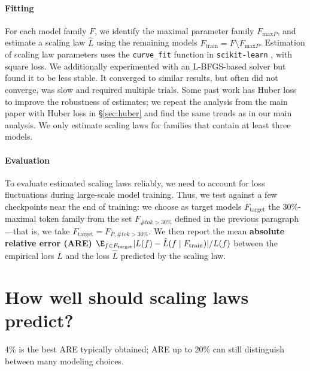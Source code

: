 \documentclass{article}
\makeatletter
\theoremstyle{plain}
\theoremstyle{definition}
\theoremstyle{remark}
\DeclarePairedDelimiter\abs{\lvert}{\rvert}%
\let\oldabs\abs
\def\abs{\@ifstar{\oldabs}{\oldabs*}}
\newcommand{\mathmsize}{\#\texttt{params}}
\newcommand{\mathperf}{L}
\newcommand{\msize}{$\mathmsize{}$}
\newcommand{\perf}{loss}%
\DeclareMathOperator{\Send}{end}
\newcommand{\xmodel}{f}
\newcommand{\xfamily}{F}
\newcommand{\xtrain}{F_\mathrm{train}}
\newcommand{\xtarget}{F_\mathrm{target}}
\newcommand{\maxtok}[1]{\xfamily_{\# tok>#1}}
\newcommand{\maxparam}{\xfamily_{\mathrm{max}P}}
\newcommand{\summarybox}[1]{
  \begin{tcolorbox}[
    enhanced,
    colback=olive!8,
    colframe=olive!50,
    boxrule=0.5pt,
    left=8pt,
    right=8pt,
    top=6pt,
    bottom=6pt,
    arc=1.5mm,
    boxsep=0pt,
    fontupper=\normalfont\small\itshape,
    frame hidden,
    before skip=0pt,  %
    after skip=8pt,   %
  ]
    #1
  \end{tcolorbox}
}
\makeatother
\begin{document}
\paragraph{Fitting} For each model family $\xfamily$, we identify the maximal parameter family $\maxparam{}$, and estimate a scaling law $\hat{L}$ using the remaining models $\xtrain = \xfamily \setminus \maxparam{}$.
Estimation of scaling law parameters uses the \texttt{curve\_fit} function in \texttt{scikit-learn} \citep{pedregosa2011scikit}, with square loss. We additionally experimented with an L-BFGS-based solver but found it to be less stable. It converged to similar results, but often did not converge, was slow and required multiple trials.
Some past work has Huber loss to improve the robustness of estimates; we repeat the analysis from the main paper with Huber loss in \S\ref{sec:huber} and find the same trends as in our main analysis.
We only estimate scaling laws for families that contain at least three models.

\paragraph{Evaluation} 
To evaluate estimated scaling laws reliably, we need to account for loss fluctuations during large-scale model training. Thus, we test against a few checkpoints near the end of training: we choose as target models $\xtarget$ the $30\%$-maximal token family from the set $\maxtok{30\%}$ defined in the previous paragraph---that is, we take $\xtarget = \xfamily_{P,\# tok>30\%}$.
We then report the mean \textbf{absolute relative error (ARE)} $\E_{\xmodel \in \xtarget}|L(\xmodel) - \hat{L}(\xmodel \mid \xtrain)| / L(\xmodel)$  between the empirical loss $L$ and the loss $\hat{L}$ predicted by the scaling law. 




\section{How well should scaling laws predict?}\label{sec:how-well}
\summarybox{4\% is the best ARE typically obtained; ARE up to 20\% can still distinguish between many modeling choices.}
\end{document}
